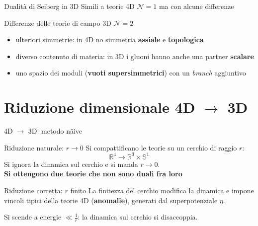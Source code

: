 \documentclass[10pt,compress,usenames,dvipsnames]{beamer}
\begin{document}
\begin{frame}{Dualità di Seiberg in 3D}
Simili a teorie 4D $\mathcal{N}=1$ ma con alcune differenze
\begin{block}{Differenze delle teorie di campo 3D $\mathcal{N}=2$}
\begin{itemize}
\item ulteriori simmetrie: in 4D no simmetria \alert{\bfseries assiale} e \alert{\bfseries topologica} 
\item diverso contenuto di materia: in 3D i gluoni hanno anche una partner \alert{\bfseries scalare} 
\item uno spazio dei moduli (\alert{\bfseries vuoti supersimmetrici}) con un \emph{branch} aggiuntivo  
\end{itemize}
\end{block}

\end{frame}



\section{Riduzione dimensionale 4D $ \rightarrow$ 3D}






\begin{frame}{4D $ \longrightarrow $ 3D: metodo n\"{a}ive}
\vspace{-0.5cm}
\begin{block}{Riduzione naturale: $r \rightarrow 0$}
Si compattificano le teorie su un cerchio di raggio $r$: $$\mathbb{R}^4 \longrightarrow \mathbb{R}^3 \times \mathbb{S}^1$$
Si ignora la dinamica sul cerchio e si manda $r \rightarrow 0$.\\
\alert{\bfseries  Si ottengono due teorie che non sono duali fra loro}
\end{block}

\begin{block}{Riduzione corretta: $r$ finito}
La finitezza del cerchio modifica la dinamica e impone vincoli tipici della teorie 4D (\alert{\bfseries anomalie}), generati dal superpotenziale $\eta$.\\

\end{block}
Si scende a energie $\ll \frac{1}{r}$: la dinamica sul cerchio si disaccoppia.
\end{frame}
\end{document}

